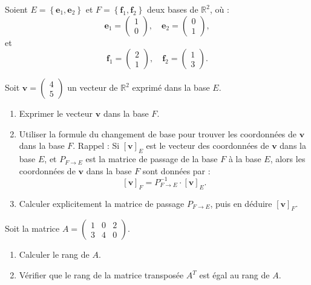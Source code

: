 \begin{exercice}
Soient \( E = \left\{ \mathbf{e}_1, \mathbf{e}_2 \right\} \) et \( F = \left\{ \mathbf{f}_1, \mathbf{f}_2 \right\} \) deux bases de \( \mathbb{R}^2 \), où :
\[
\mathbf{e}_1 = \begin{pmatrix} 1 \\ 0 \end{pmatrix}, \quad \mathbf{e}_2 = \begin{pmatrix} 0 \\ 1 \end{pmatrix},
\]
et
\[
\mathbf{f}_1 = \begin{pmatrix} 2 \\ 1 \end{pmatrix}, \quad \mathbf{f}_2 = \begin{pmatrix} 1 \\ 3 \end{pmatrix}.
\]

Soit \( \mathbf{v} = \begin{pmatrix} 4 \\ 5 \end{pmatrix} \) un vecteur de \( \mathbb{R}^2 \) exprimé dans la base \( E \).

\begin{enumerate}
    \item Exprimer le vecteur \( \mathbf{v} \) dans la base \( F \).
    \item Utiliser la formule du changement de base pour trouver les coordonnées de \( \mathbf{v} \) dans la base \( F \). Rappel : Si \( [\mathbf{v}]_E \) est le vecteur des coordonnées de \( \mathbf{v} \) dans la base \( E \), et \( P_{F \to E} \) est la matrice de passage de la base \( F \) à la base \( E \), alors les coordonnées de \( \mathbf{v} \) dans la base \( F \) sont données par :
    \[
    [\mathbf{v}]_F = P_{F \to E}^{-1} \cdot [\mathbf{v}]_E.
    \]
    \item Calculer explicitement la matrice de passage \( P_{F \to E} \), puis en déduire \( [\mathbf{v}]_F \).
\end{enumerate}
\end{exercice}

\begin{exercice}
Soit la matrice \( A = \begin{pmatrix} 1 & 0 & 2 \\ 3 & 4 & 0 \end{pmatrix} \).
\begin{enumerate}
    \item Calculer le rang de \( A \).
    \item Vérifier que le rang de la matrice transposée \( A^T \) est égal au rang de \( A \).
\end{enumerate}
\end{exercice}

